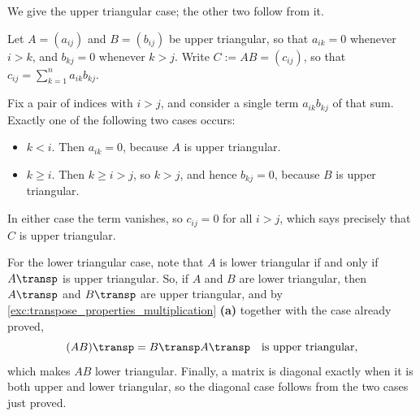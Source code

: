 \begin{exercisesolution}
\label{sol:triangular_multiplication_closure}
We give the upper triangular case; the other two follow from it.

Let $A = (a_{ij})$ and $B = (b_{ij})$ be upper triangular, so that $a_{ik} = 0$ whenever $i > k$, and $b_{kj} = 0$ whenever $k > j$. Write $C := AB = (c_{ij})$, so that $c_{ij} = \sum_{k=1}^{n} a_{ik} b_{kj}$.

Fix a pair of indices with $i > j$, and consider a single term $a_{ik} b_{kj}$ of that sum. Exactly one of the following two cases occurs:
\begin{itemize}
    \item $k < i$. Then $a_{ik} = 0$, because $A$ is upper triangular.
    \item $k \ge i$. Then $k \ge i > j$, so $k > j$, and hence $b_{kj} = 0$, because $B$ is upper triangular.
\end{itemize}
In either case the term vanishes, so $c_{ij} = 0$ for all $i > j$, which says precisely that $C$ is upper triangular.

For the lower triangular case, note that $A$ is lower triangular if and only if $A\transp$ is upper triangular. So, if $A$ and $B$ are lower triangular, then $A\transp$ and $B\transp$ are upper triangular, and by \cref{exc:transpose_properties_multiplication} \textbf{(a)} together with the case already proved,
\[
(AB)\transp = B\transp A\transp \quad \text{is upper triangular,}
\]
which makes $AB$ lower triangular. Finally, a matrix is diagonal exactly when it is both upper and lower triangular, so the diagonal case follows from the two cases just proved.
\end{exercisesolution}



